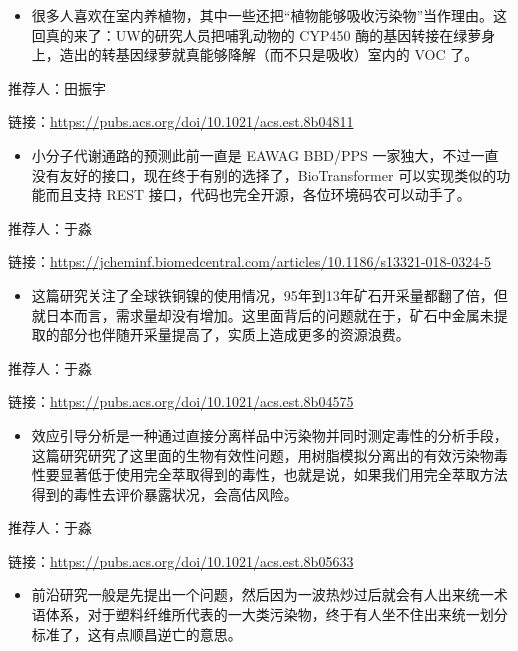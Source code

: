 \documentclass[
]{book}
\providecommand{\tightlist}{%
  \setlength{\itemsep}{0pt}\setlength{\parskip}{0pt}}
\begin{document}
\begin{itemize}
\tightlist
\item
  很多人喜欢在室内养植物，其中一些还把``植物能够吸收污染物''当作理由。这回真的来了：UW的研究人员把哺乳动物的 CYP450 酶的基因转接在绿萝身上，造出的转基因绿萝就真能够降解（而不只是吸收）室内的 VOC 了。
\end{itemize}

推荐人：田振宇

链接：\url{https://pubs.acs.org/doi/10.1021/acs.est.8b04811}

\begin{itemize}
\tightlist
\item
  小分子代谢通路的预测此前一直是 EAWAG BBD/PPS 一家独大，不过一直没有友好的接口，现在终于有别的选择了，BioTransformer 可以实现类似的功能而且支持 REST 接口，代码也完全开源，各位环境码农可以动手了。
\end{itemize}

推荐人：于淼

链接：\url{https://jcheminf.biomedcentral.com/articles/10.1186/s13321-018-0324-5}

\begin{itemize}
\tightlist
\item
  这篇研究关注了全球铁铜镍的使用情况，95年到13年矿石开采量都翻了倍，但就日本而言，需求量却没有增加。这里面背后的问题就在于，矿石中金属未提取的部分也伴随开采量提高了，实质上造成更多的资源浪费。
\end{itemize}

推荐人：于淼

链接：\url{https://pubs.acs.org/doi/10.1021/acs.est.8b04575}

\begin{itemize}
\tightlist
\item
  效应引导分析是一种通过直接分离样品中污染物并同时测定毒性的分析手段，这篇研究研究了这里面的生物有效性问题，用树脂模拟分离出的有效污染物毒性要显著低于使用完全萃取得到的毒性，也就是说，如果我们用完全萃取方法得到的毒性去评价暴露状况，会高估风险。
\end{itemize}

推荐人：于淼

链接：\url{https://pubs.acs.org/doi/10.1021/acs.est.8b05633}

\begin{itemize}
\tightlist
\item
  前沿研究一般是先提出一个问题，然后因为一波热炒过后就会有人出来统一术语体系，对于塑料纤维所代表的一大类污染物，终于有人坐不住出来统一划分标准了，这有点顺昌逆亡的意思。
\end{itemize}
\end{document}
